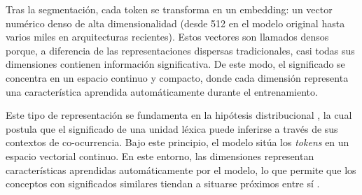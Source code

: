 \documentclass[12pt,a4paper]{report}
\begin{document}
Tras la segmentación, cada token se transforma en un embedding: un vector numérico denso de alta dimensionalidad 
(desde 512 en el modelo original hasta varios miles en arquitecturas recientes). Estos vectores son llamados densos porque, a diferencia de las representaciones dispersas tradicionales, casi todas sus dimensiones contienen información significativa. De este modo, el significado se concentra en un espacio continuo y compacto, donde cada dimensión representa una característica aprendida automáticamente durante el entrenamiento.

Este tipo de representación se fundamenta en la hipótesis distribucional \cite{harris1954distributional}, la cual postula que el significado de una unidad léxica puede inferirse a través de sus contextos de co-ocurrencia. Bajo este principio, el modelo sitúa los \textit{tokens} en un espacio vectorial continuo. En este entorno, las dimensiones representan características aprendidas automáticamente por el modelo, lo que permite que los conceptos con significados similares tiendan a situarse próximos entre sí \cite{mikolov2013distributed}.
\end{document}

